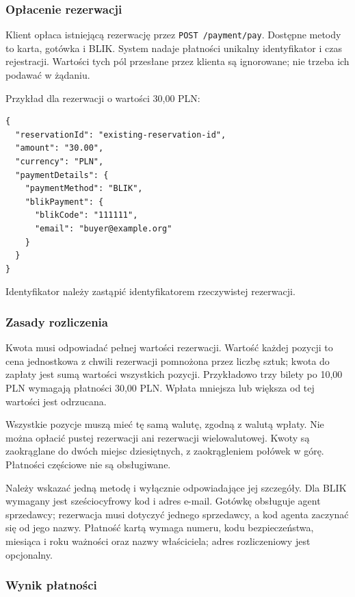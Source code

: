 \subsubsection{Opłacenie rezerwacji}
\label{api:payment}

Klient opłaca istniejącą rezerwację przez \texttt{POST /payment/pay}.
Dostępne metody to karta, gotówka i BLIK. System nadaje płatności
unikalny identyfikator i czas rejestracji. Wartości tych pól przesłane
przez klienta są ignorowane; nie trzeba ich podawać w żądaniu.

Przykład dla rezerwacji o wartości 30,00 PLN:
\begin{verbatim}
{
  "reservationId": "existing-reservation-id",
  "amount": "30.00",
  "currency": "PLN",
  "paymentDetails": {
    "paymentMethod": "BLIK",
    "blikPayment": {
      "blikCode": "111111",
      "email": "buyer@example.org"
    }
  }
}
\end{verbatim}
Identyfikator należy zastąpić identyfikatorem rzeczywistej rezerwacji.

\subsubsection{Zasady rozliczenia}

Kwota musi odpowiadać pełnej wartości rezerwacji. Wartość każdej
pozycji to cena jednostkowa z chwili rezerwacji pomnożona przez liczbę
sztuk; kwota do zapłaty jest sumą wartości wszystkich pozycji.
Przykładowo trzy bilety po 10,00 PLN wymagają płatności 30,00 PLN.
Wpłata mniejsza lub większa od tej wartości jest odrzucana.

Wszystkie pozycje muszą mieć tę samą walutę, zgodną z walutą wpłaty.
Nie można opłacić pustej rezerwacji ani rezerwacji wielowalutowej.
Kwoty są zaokrąglane do dwóch miejsc dziesiętnych, z zaokrągleniem
połówek w górę. Płatności częściowe nie są obsługiwane.

Należy wskazać jedną metodę i wyłącznie odpowiadające jej szczegóły.
Dla BLIK wymagany jest sześciocyfrowy kod i adres e-mail.
Gotówkę obsługuje agent sprzedawcy; rezerwacja musi dotyczyć jednego
sprzedawcy, a kod agenta zaczynać się od jego nazwy.
Płatność kartą wymaga numeru, kodu bezpieczeństwa, miesiąca i roku
ważności oraz nazwy właściciela; adres rozliczeniowy jest opcjonalny.

\subsubsection{Wynik płatności}

